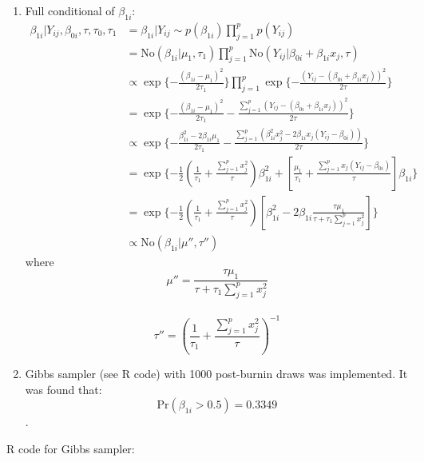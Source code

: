 \documentclass{article}
\begin{document}
\begin{enumerate}
	
	\item Full conditional of $\beta_{1i}$:
	\begin{align*}
		\beta_{1i}|Y_{ij},\beta_{0i}, \tau, \tau_0, \tau_1 &= \beta_{1i}|Y_{ij} \sim p(\beta_{1i})\prod_{j=1}^{p}p(Y_{ij}) \\
		&=\text{No}(\beta_{1i}|\mu_1, \tau_1)\prod_{j=1}^{p}\text{No}(Y_{ij}|\beta_{0i}+\beta_{1i}x_j, \tau) \\
		&\propto \exp\{-\frac{(\beta_{1i}-\mu_1)^2}{2\tau_1}\}\prod_{j=1}^{p}\exp\{-\frac{(Y_{ij}-(\beta_{0i}+\beta_{1i}x_j))^2}{2\tau}\} \\
		&=\exp\{-\frac{(\beta_{1i}-\mu_1)^2}{2\tau_1}-\frac{\sum\nolimits_{j=1}^p(Y_{ij}-(\beta_{0i}+\beta_{1i}x_j))^2}{2\tau}\} \\	
		&\propto \exp\{-\frac{\beta_{1i}^2-2\beta_{1i}\mu_1}{2\tau_1}-\frac{\sum\nolimits_{j=1}^p(\beta_{1i}^2x_j^2-2\beta_{1i}x_j(Y_{ij}-\beta_{0i}))}{2\tau}\}\\
		&=\exp\{-\frac{1}{2}(\frac{1}{\tau_1}+\frac{\sum\nolimits_{j=1}^p x_j^2}{\tau})\beta_{1i}^2+[\frac{\mu_1}{\tau_1}+\frac{\sum\nolimits_{j=1}^p x_j(Y_{ij}-\beta_{0i})}{\tau}]\beta_{1i}  \}\\
		&=\exp\{-\frac{1}{2}(\frac{1}{\tau_1}+\frac{\sum\nolimits_{j=1}^p x_j^2}{\tau})[\beta_{1i}^2-2\beta_{1i}\frac{\tau\mu_1}{\tau+\tau_1\sum\nolimits_{j=1}^p x_j^2}] \}\\
		&\propto \text{No}(\beta_{1i}|\mu'', \tau'')
	\end{align*}
	where
	$$\mu''= \frac{\tau\mu_1}{\tau+\tau_1\sum\nolimits_{j=1}^p x_j^2} $$\\
	$$\tau'' = (\frac{1}{\tau_1}+\frac{\sum\nolimits_{j=1}^p x_j^2}{\tau})^{-1} $$
	
	\item Gibbs sampler (see R code) with 1000 post-burnin draws was implemented. It was found that:
	$$\text{Pr}(\beta_{1i}>0.5)=0.3349$$.
	\end{enumerate}

\pagebreak
R code for Gibbs sampler:
\end{document}
